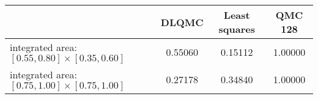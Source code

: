 \begin{tabular}{|l|c|c|c|}
\hline
 &DLQMC&Least squares&QMC 128\\ 
\hline

integrated area: $[0.55,0.80]\times [0.35,0.60]$ & 0.55060 & 0.15112 & 1.00000\\ 
\hline
integrated area: $[0.75,1.00]\times [0.75,1.00]$ & 0.27178 & 0.34840 & 1.00000\\ 
\hline
\end{tabular}

